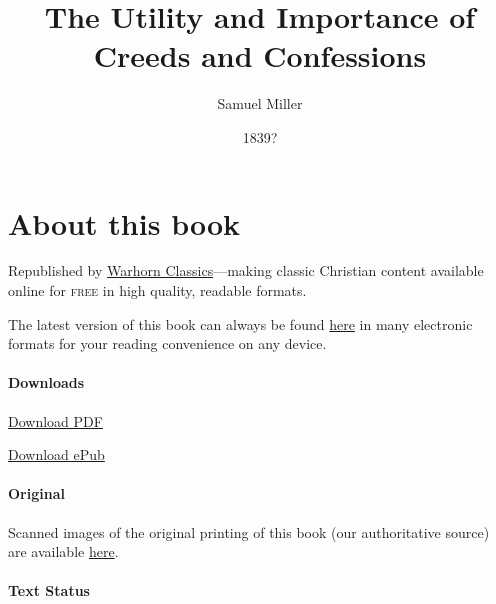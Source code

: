 \documentclass[
]{book}
\title{The Utility and Importance of Creeds and Confessions}
\author{Samuel Miller}
\date{1839?}
\begin{document}
\maketitle

\mainmatter
{}

{
\setcounter{tocdepth}{1}
\tableofcontents
}
\hypertarget{about-this-book}{%
\chapter*{About this book}\label{about-this-book}}

Republished by \href{https://classics.warhornmedia.com/}{Warhorn Classics}---making classic Christian content available online for \textsc{free} in high quality, readable formats.

The latest version of this book can always be found \href{https://warhornmedia.github.io/miller-creeds-and-confessions/}{here} in many electronic formats for your reading convenience on any device.

\hypertarget{downloads}{%
\subsubsection*{Downloads}\label{downloads}}

\href{https://warhornmedia.github.io/miller-creeds-and-confessions//Miller-Creeds_and_Confessions.pdf}{Download PDF}

\href{https://warhornmedia.github.io/miller-creeds-and-confessions//Miller-Creeds_and_Confessions.epub}{Download ePub}

\hypertarget{original}{%
\subsubsection*{Original}\label{original}}

Scanned images of the original printing of this book (our authoritative source) are available \href{https://archive.org/details/utilityimportanc00milluoft/page/n3/mode/2up}{here}.

\hypertarget{text-status}{%
\subsubsection*{Text Status}\label{text-status}}
\end{document}
